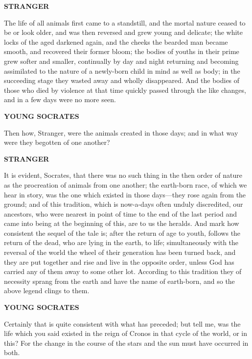 \documentclass[11pt,letter]{article}
\begin{document}
\par \textbf{STRANGER}
\par   The life of all animals first came to a standstill, and the mortal nature ceased to be or look older, and was then reversed and grew young and delicate; the white locks of the aged darkened again, and the cheeks the bearded man became smooth, and recovered their former bloom; the bodies of youths in their prime grew softer and smaller, continually by day and night returning and becoming assimilated to the nature of a newly-born child in mind as well as body; in the succeeding stage they wasted away and wholly disappeared. And the bodies of those who died by violence at that time quickly passed through the like changes, and in a few days were no more seen.

\par \textbf{YOUNG SOCRATES}
\par   Then how, Stranger, were the animals created in those days; and in what way were they begotten of one another?

\par \textbf{STRANGER}
\par   It is evident, Socrates, that there was no such thing in the then order of nature as the procreation of animals from one another; the earth-born race, of which we hear in story, was the one which existed in those days—they rose again from the ground; and of this tradition, which is now-a-days often unduly discredited, our ancestors, who were nearest in point of time to the end of the last period and came into being at the beginning of this, are to us the heralds. And mark how consistent the sequel of the tale is; after the return of age to youth, follows the return of the dead, who are lying in the earth, to life; simultaneously with the reversal of the world the wheel of their generation has been turned back, and they are put together and rise and live in the opposite order, unless God has carried any of them away to some other lot. According to this tradition they of necessity sprang from the earth and have the name of earth-born, and so the above legend clings to them.

\par \textbf{YOUNG SOCRATES}
\par   Certainly that is quite consistent with what has preceded; but tell me, was the life which you said existed in the reign of Cronos in that cycle of the world, or in this? For the change in the course of the stars and the sun must have occurred in both.
\end{document}
